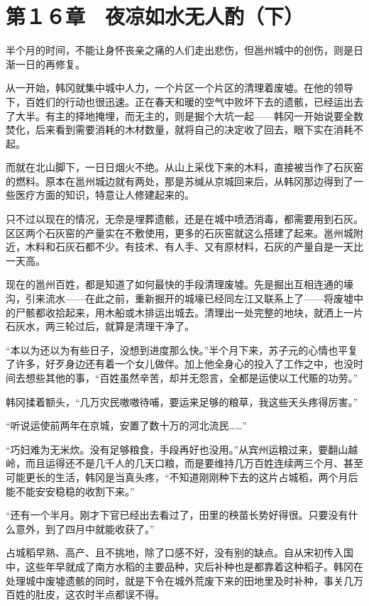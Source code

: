 \section{第１６章　夜凉如水无人酌（下）}

半个月的时间，不能让身怀丧亲之痛的人们走出悲伤，但邕州城中的创伤，则是日渐一日的再修复。

从一开始，韩冈就集中城中人力，一个片区一个片区的清理着废墟。在他的领导下，百姓们的行动也很迅速。正在春天和暖的空气中败坏下去的遗骸，已经运出去了大半。有主的择地掩埋，而无主的，则是掘个大坑一起——韩冈一开始说要全数焚化，后来看到需要消耗的木材数量，就将自己的决定收了回去，眼下实在消耗不起。

而就在北山脚下，一日日烟火不绝。从山上采伐下来的木料，直接被当作了石灰窑的燃料。原本在邕州城边就有两处，那是苏缄从京城回来后，从韩冈那边得到了一些医疗方面的知识，特意让人修建起来的。

只不过以现在的情况，无奈是埋葬遗骸，还是在城中喷洒消毒，都需要用到石灰。区区两个石灰窑的产量实在不敷使用，更多的石灰窑就这么搭建了起来。邕州城附近，木料和石灰石都不少。有技术、有人手、又有原材料，石灰的产量自是一天比一天高。

现在的邕州百姓，都是知道了如何最快的手段清理废墟。先是掘出互相连通的壕沟，引来流水——在此之前，重新掘开的城壕已经同左江又联系上了——将废墟中的尸骸都收拾起来，用木船或木排运出城去。清理出一处完整的地块，就洒上一片石灰水，两三轮过后，就算是清理干净了。

“本以为还以为有些日子，没想到进度那么快。”半个月下来，苏子元的心情也平复了许多，好歹身边还有着一个女儿做伴。加上他全身心的投入了工作之中，也没时间去想些其他的事，“百姓虽然辛苦，却并无怨言，全都是运使以工代赈的功劳。”

韩冈揉着额头，“几万灾民嗷嗷待哺，要运来足够的粮草，我这些天头疼得厉害。”

“听说运使前两年在京城，安置了数十万的河北流民……”

“巧妇难为无米炊。没有足够粮食，手段再好也没用。”从宾州运粮过来，要翻山越岭，而且运得还不是几千人的几天口粮，而是要维持几万百姓连续两三个月、甚至可能更长的生活，韩冈是当真头疼，“不知道刚刚种下去的这片占城稻，两个月后能不能安安稳稳的收割下来。”

“还有一个半月。刚才下官已经出去看过了，田里的秧苗长势好得很。只要没有什么意外，到了四月中就能收获了。”

占城稻早熟、高产、且不挑地，除了口感不好，没有别的缺点。自从宋初传入国中，这些年早就成了南方水稻的主要品种，灾后补种也是都靠着这种稻子。韩冈在处理城中废墟遗骸的同时，就是下令在城外荒废下来的田地里及时补种，事关几万百姓的肚皮，这农时半点都误不得。

